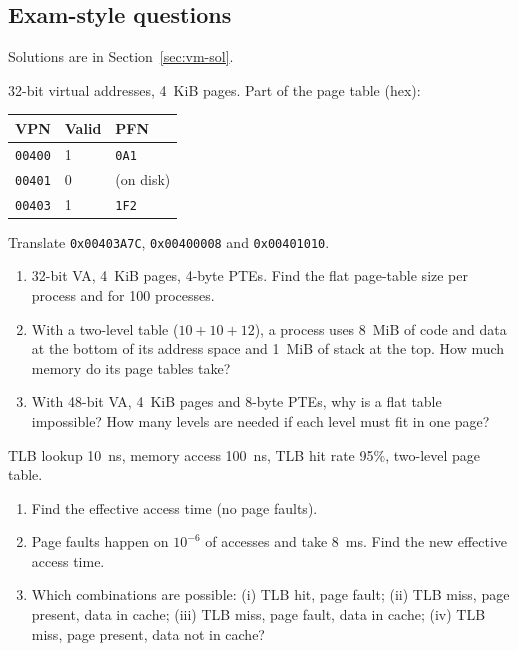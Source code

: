 \subsection{Exam-style questions}
Solutions are in Section~\ref{sec:vm-sol}.

\begin{exercise}\label{q:vm-trans}
32-bit virtual addresses, 4~KiB pages. Part of the page table (hex):
\begin{center}
\small
\begin{tabular}{@{}lll@{}}
\toprule
VPN & Valid & PFN \\
\midrule
\texttt{00400} & 1 & \texttt{0A1} \\
\texttt{00401} & 0 & (on disk) \\
\texttt{00403} & 1 & \texttt{1F2} \\
\bottomrule
\end{tabular}
\end{center}
Translate \texttt{0x00403A7C}, \texttt{0x00400008} and \texttt{0x00401010}.
\end{exercise}

\begin{exercise}\label{q:vm-size}
\leavevmode
\begin{enumerate}[label=(\alph*),leftmargin=*]
  \item 32-bit VA, 4~KiB pages, 4-byte PTEs. Find the flat page-table size per
  process and for 100 processes.
  \item With a two-level table ($10+10+12$), a process uses 8~MiB of code and data
  at the bottom of its address space and 1~MiB of stack at the top. How much memory
  do its page tables take?
  \item With 48-bit VA, 4~KiB pages and 8-byte PTEs, why is a flat table impossible?
  How many levels are needed if each level must fit in one page?
\end{enumerate}
\end{exercise}

\begin{exercise}\label{q:vm-eat}
TLB lookup 10~ns, memory access 100~ns, TLB hit rate 95\%, two-level page table.
\begin{enumerate}[label=(\alph*),leftmargin=*]
  \item Find the effective access time (no page faults).
  \item Page faults happen on $10^{-6}$ of accesses and take 8~ms. Find the new
  effective access time.
  \item Which combinations are possible: (i) TLB hit, page fault; (ii) TLB miss,
  page present, data in cache; (iii) TLB miss, page fault, data in cache;
  (iv) TLB miss, page present, data not in cache?
\end{enumerate}
\end{exercise}

